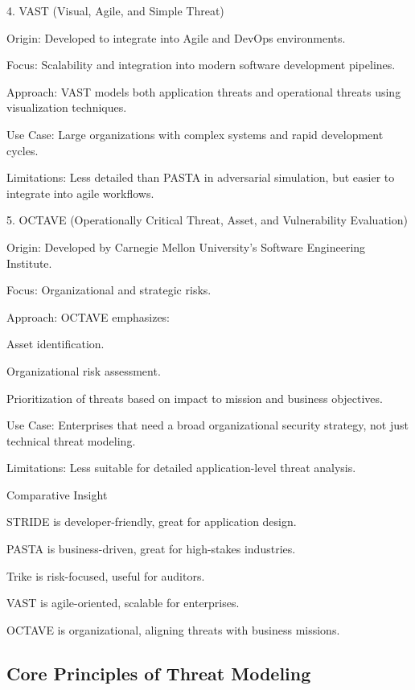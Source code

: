 \documentclass{article}
\begin{document}
4. VAST (Visual, Agile, and Simple Threat)

Origin: Developed to integrate into Agile and DevOps environments.

Focus: Scalability and integration into modern software development pipelines.

Approach: VAST models both application threats and operational threats using visualization techniques.

Use Case: Large organizations with complex systems and rapid development cycles.

Limitations: Less detailed than PASTA in adversarial simulation, but easier to integrate into agile workflows.

5. OCTAVE (Operationally Critical Threat, Asset, and Vulnerability Evaluation)

Origin: Developed by Carnegie Mellon University’s Software Engineering Institute.

Focus: Organizational and strategic risks.

Approach: OCTAVE emphasizes:

Asset identification.

Organizational risk assessment.

Prioritization of threats based on impact to mission and business objectives.

Use Case: Enterprises that need a broad organizational security strategy, not just technical threat modeling.

Limitations: Less suitable for detailed application-level threat analysis.

Comparative Insight

STRIDE is developer-friendly, great for application design.

PASTA is business-driven, great for high-stakes industries.

Trike is risk-focused, useful for auditors.

VAST is agile-oriented, scalable for enterprises.

OCTAVE is organizational, aligning threats with business missions.
\subsection{Core Principles of Threat Modeling}






\end{document}
